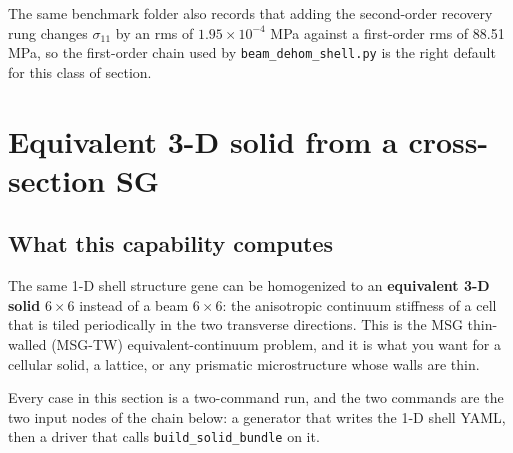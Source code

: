 The same benchmark folder also records that adding the second-order recovery rung
changes $\sigma_{11}$ by an rms of $1.95\times10^{-4}$ MPa against a first-order
rms of 88.51 MPa, so the first-order chain used by \texttt{beam\_dehom\_shell.py}
is the right default for this class of section.

\section{Equivalent 3-D solid from a cross-section SG}
\label{sec:shell-solid-xsec}

\subsection{What this capability computes}

The same 1-D shell structure gene can be homogenized to an \textbf{equivalent 3-D
solid} $6\times6$ instead of a beam $6\times6$: the anisotropic continuum
stiffness of a cell that is tiled periodically in the two transverse directions.
This is the MSG thin-walled (MSG-TW) equivalent-continuum problem, and it is what
you want for a cellular solid, a lattice, or any prismatic microstructure whose
walls are thin.

Every case in this section is a two-command run, and the two commands are the
two input nodes of the chain below: a generator that writes the 1-D shell YAML,
then a driver that calls \texttt{build\_solid\_bundle} on it.


